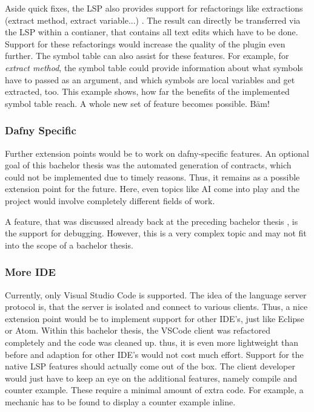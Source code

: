 Aside quick fixes, the LSP also provides support for refactorings like extractions (extract method, extract variable...) \cite{lspspec}.
The result can directly be transferred via the LSP within a  contianer, that contains all text edits which have to be done.
Support for these refactorings would increase the quality of the plugin even further.
The symbol table can also assist for these features.
For example, for \textit{extract method}, the symbol table could provide information about what symbols have to passed as an argument, and which symbols are local variables and get extracted, too.
This example shows, how far the benefits of the implemented symbol table reach.
A whole new set of feature becomes possible. Bäm! 

\subsubsection{Dafny Specific}
Further extension points would be to work on dafny-specific features.
An optional goal of this bachelor thesis was the automated generation of contracts, which could not be implemented due to timely reasons.
Thus, it remains as a possible extension point for the future.
Here, even topics like AI come into play and the project would involve completely different fields of work.

A feature, that was discussed already back at the preceding bachelor thesis \cite{ba}, is the support for debugging.
However, this is a very complex topic and may not fit into the scope of a bachelor thesis.


\subsubsection{More IDE}
Currently, only Visual Studio Code is supported.
The idea of the language server protocol is, that the server is isolated and connect to various clients.
Thus, a nice extension point would be to implement support for other IDE's, just like Eclipse or Atom.
Within this bachelor thesis, the VSCode client was refactored completely and the code was cleaned up.
thus, it is even more lightweight than before and adaption for other IDE's would not cost much effort.
Support for the native LSP features should actually come out of the box.
The client developer would just have to keep an eye on the additional features, namely compile and counter example.
These require a minimal amount of extra code.
For example, a mechanic has to be found to display a counter example inline.






